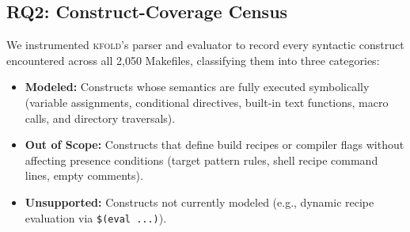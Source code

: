 \documentclass[acmsmall,screen,review]{acmart}
\newcommand{\tool}{\textsc{kfold}\xspace}
\begin{document}
\subsection{RQ2: Construct-Coverage Census}
\label{sec:eval:rq2}

We instrumented \tool's parser and evaluator to record every syntactic construct encountered across all 2,050 Makefiles, classifying them into three categories:
\begin{itemize}
\item \textbf{Modeled:} Constructs whose semantics are fully executed symbolically (variable assignments, conditional directives, built-in text functions, macro calls, and directory traversals).
\item \textbf{Out of Scope:} Constructs that define build recipes or compiler flags without affecting presence conditions (target pattern rules, shell recipe command lines, empty comments).
\item \textbf{Unsupported:} Constructs not currently modeled (e.g., dynamic recipe evaluation via \texttt{\$(eval ...)}).
\end{itemize}
\end{document}
